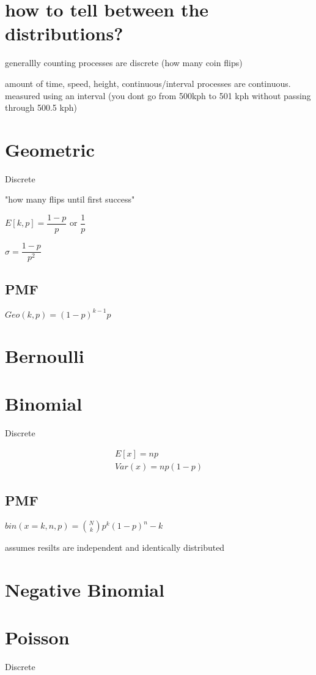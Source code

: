 \documentclass[12pt,fleqn]{article}
\begin{document}

\section{how to tell between the distributions?}

generallly counting processes are discrete (how many coin flips)

amount of time, speed, height, continuous/interval processes are continuous. measured using an interval (you dont go from 500kph to 501 kph without passing through 500.5 kph)



\section{Geometric}
Discrete

"how many flips until first success"

$E[k, p] = \dfrac{1-p}{p}$ or $\dfrac{1}{p}$

$\sigma = \dfrac{1-p}{p^2}$

\subsection{PMF}
$Geo(k, p) = (1-p)^{k-1}p$

\section{Bernoulli}
\section{Binomial}
Discrete

\begin{align*}
	E[x] = np\\
	Var(x) = np(1-p)
\end{align*}

\subsection{PMF}
$bin(x=k,n,p) = {N\choose k} p^k(1-p)^n-k$

assumes resilts are independent and identically distributed


\section{Negative Binomial}
\section{Poisson}
Discrete
\end{document}
